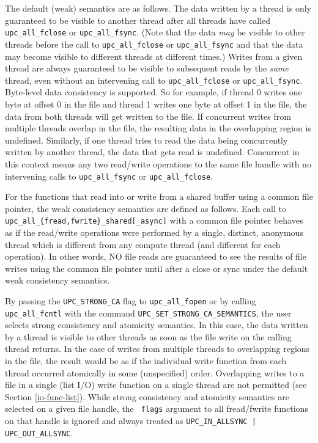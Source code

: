 \np The default (weak) semantics are as follows. The data written by a thread is
only guaranteed to be visible to another thread after all threads have
called {\tt upc\_all\_fclose} or {\tt upc\_all\_fsync}. (Note that the data \textit{%
may} be visible to other threads before the call to {\tt upc\_all\_fclose} or
{\tt upc\_all\_fsync} and that the data may become visible to different
threads at different times.) Writes from a given thread are always
guaranteed to be visible to subsequent reads by the \textit{same} thread,
even without an intervening call to {\tt upc\_all\_fclose} or {\tt upc\_all\_fsync}.
Byte-level data consistency is supported. So for example, if thread 0
writes one byte at offset 0 in the file and thread 1 writes one byte at
offset 1 in the file, the data from both threads will get written to the
file. If concurrent writes from multiple threads overlap in the file, the
resulting data in the overlapping region is undefined. Similarly, if one
thread tries to read the data being concurrently written by another thread,
the data that gets read is undefined. Concurrent in this context means any
two read/write operations to the same file handle with no intervening calls
to {\tt upc\_all\_fsync} or {\tt upc\_all\_fclose}.

\np For the functions that read into or write from a shared buffer using a
common file pointer, the weak consistency semantics are defined as follows.
Each call to {\tt upc\_all\_\{fread,fwrite\}\_shared[\_async]} with a common file
pointer behaves as if the read/write operations were performed by a single,
distinct, anonymous thread which is different from any compute thread (and
different for each operation). In other words, NO file reads are guaranteed to
see the results of file writes using the common file pointer until after a close
or sync under the default weak consistency semantics.

\np By passing the {\tt UPC\_STRONG\_CA} flag to {\tt upc\_all\_fopen} or 
by calling {\tt upc\_all\_fcntl} with the command 
{\tt UPC\_SET\_STRONG\_CA\_SEMANTICS}, the user selects strong
consistency and atomicity semantics. In this case, the data written by a
thread is visible to other threads as soon as the file write on the calling
thread returns. In the case of writes from multiple threads to overlapping
regions in the file, the result would be as if the individual write function
from each thread occurred atomically in some (unspecified) order.
Overlapping writes to a file in a single (list I/O) write function on a
single thread are not permitted (see Section \ref{io-func-list}). While strong consistency
and atomicity semantics are selected on a given file handle, the {\tt
flags} argument to all fread/fwrite functions on that handle is ignored
and always treated as {\tt UPC\_IN\_ALLSYNC | UPC\_OUT\_ALLSYNC}.

